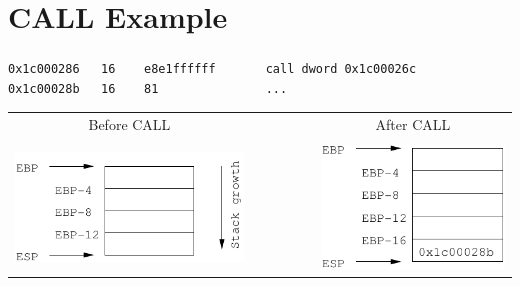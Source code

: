 \documentclass{beamer}
\begin{document}
\section{CALL Example}
\begin{frame}[fragile]
  \frametitle{\insertsection}

\begin{lstlisting}[basicstyle=\footnotesize\tt]
0x1c000286   16    e8e1ffffff       call dword 0x1c00026c
0x1c00028b   16    81               ...
\end{lstlisting}

\vfill

\begin{tabular}{ccc}
Before CALL&&After CALL\\
\\
\includegraphics[width=.44\textwidth]{stack1.pdf}&
~~~~~~~\pause&
\includegraphics[width=.37\textwidth]{stack2.pdf}\\
\end{tabular}
\end{frame}
\end{document}
